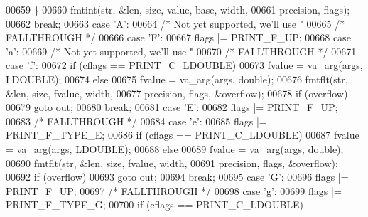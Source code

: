 \begin{DoxyCode}
{{00659                 \}
00660                 fmtint(str, &len, size, value, base, width,
00661                     precision, flags);
00662                 \textcolor{keywordflow}{break};
00663             \textcolor{keywordflow}{case} \textcolor{charliteral}{'A'}:
00664                 \textcolor{comment}{/* Not yet supported, we'll use "%
00665                 \textcolor{comment}{/* FALLTHROUGH */}
00666             \textcolor{keywordflow}{case} \textcolor{charliteral}{'F'}:
00667                 flags |= PRINT\_F\_UP;
00668             \textcolor{keywordflow}{case} \textcolor{charliteral}{'a'}:
00669                 \textcolor{comment}{/* Not yet supported, we'll use "%
00670                 \textcolor{comment}{/* FALLTHROUGH */}
00671             \textcolor{keywordflow}{case} \textcolor{charliteral}{'f'}:
00672                 \textcolor{keywordflow}{if} (cflags == PRINT\_C\_LDOUBLE)
00673                     fvalue = va\_arg(args, LDOUBLE);
00674                 \textcolor{keywordflow}{else}
00675                     fvalue = va\_arg(args, \textcolor{keywordtype}{double});
00676                 fmtflt(str, &len, size, fvalue, width,
00677                     precision, flags, &overflow);
00678                 \textcolor{keywordflow}{if} (overflow)
00679                     \textcolor{keywordflow}{goto} out;
00680                 \textcolor{keywordflow}{break};
00681             \textcolor{keywordflow}{case} \textcolor{charliteral}{'E'}:
00682                 flags |= PRINT\_F\_UP;
00683                 \textcolor{comment}{/* FALLTHROUGH */}
00684             \textcolor{keywordflow}{case} \textcolor{charliteral}{'e'}:
00685                 flags |= PRINT\_F\_TYPE\_E;
00686                 \textcolor{keywordflow}{if} (cflags == PRINT\_C\_LDOUBLE)
00687                     fvalue = va\_arg(args, LDOUBLE);
00688                 \textcolor{keywordflow}{else}
00689                     fvalue = va\_arg(args, \textcolor{keywordtype}{double});
00690                 fmtflt(str, &len, size, fvalue, width,
00691                     precision, flags, &overflow);
00692                 \textcolor{keywordflow}{if} (overflow)
00693                     \textcolor{keywordflow}{goto} out;
00694                 \textcolor{keywordflow}{break};
00695             \textcolor{keywordflow}{case} \textcolor{charliteral}{'G'}:
00696                 flags |= PRINT\_F\_UP;
00697                 \textcolor{comment}{/* FALLTHROUGH */}
00698             \textcolor{keywordflow}{case} \textcolor{charliteral}{'g'}:
00699                 flags |= PRINT\_F\_TYPE\_G;
00700                 \textcolor{keywordflow}{if} (cflags == PRINT\_C\_LDOUBLE)
}}}}
\end{DoxyCode}
